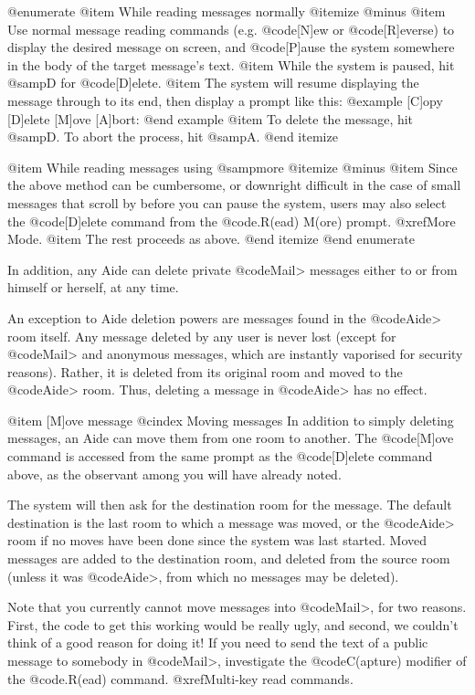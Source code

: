 @enumerate
@item
While reading messages normally
@itemize @minus
@item
Use normal message reading commands (e.g. @code{[N]ew} or
@code{[R]everse}) to display the desired message on screen,
and @code{[P]ause} the system somewhere in the body of the
target message's text.
@item
While the system is paused, hit @samp{D} for @code{[D]elete}.
@item
The system will resume displaying the message through
to its end, then display a prompt like this:
@example
[C]opy [D]elete [M]ove [A]bort:
@end example
@item
To delete the message, hit @samp{D}.  To abort the process,
hit @samp{A}.
@end itemize

@item
While reading messages using @samp{more}
@itemize @minus
@item
Since the above method can be cumbersome, or downright
difficult in the case of small messages that
scroll by before you can pause the system, users may
also select the @code{[D]elete} command from the @code{.R(ead) M(ore)}
prompt.  @xref{More Mode}.
@item
The rest proceeds as above.
@end itemize
@end enumerate

In addition, any Aide can delete private @code{Mail>}
messages either to or from himself or herself, at any time.

An exception to Aide deletion powers are messages
found in the @code{Aide>} room itself.  Any message deleted by any
user is never lost (except for @code{Mail>} and anonymous messages,
which are instantly
vaporised for security reasons).  Rather, it is deleted from
its original room and moved to the @code{Aide>} room.  Thus, deleting
a message in @code{Aide>} has no effect.

@item [M]ove message
@cindex Moving messages
In addition to simply deleting messages, an Aide can
move them from one room to another.  The @code{[M]ove} command is
accessed from the same prompt as the @code{[D]elete} command above,
as the observant among you will have already noted.

The system will then ask for the destination room for
the message.  The default destination is the last room to
which a message was moved, or the @code{Aide>} room if no moves have
been done since the system was last started.  Moved messages
are added to the destination room, and deleted from the
source room (unless it was @code{Aide>}, from which no messages may
be deleted).

Note that you currently cannot move messages into @code{Mail>},
for two reasons.  First, the code to get this working would be
really ugly, and second, we couldn't think of a good reason
for doing it!  If you need to send the text of a public
message to somebody in @code{Mail>}, investigate the @code{C(apture)}
modifier of the @code{.R(ead)} command.  @xref{Multi-key read commands}.

